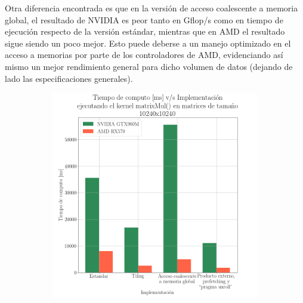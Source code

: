 Otra diferencia encontrada es que en la versión de acceso coalescente a memoria global, el resultado de NVIDIA es peor tanto en Gflop/s como en tiempo de ejecución respecto de la versión estándar, mientras que en AMD el resultado sigue siendo un poco mejor.
Esto puede deberse a un manejo optimizado en el acceso a memorias por parte de los controladores de AMD, evidenciando así mismo un mejor rendimiento general para dicho volumen de datos (dejando de lado las especificaciones generales). 

\begin{figure}[H]
  \centering
  \begin{subfigure}{0.5\textwidth}
    \includegraphics[width=\linewidth]{Figures/plot2.png}
    \caption{} 
  \end{subfigure}%
  \begin{subfigure}{0.5\textwidth}

\end{subfigure}
\end{figure}

